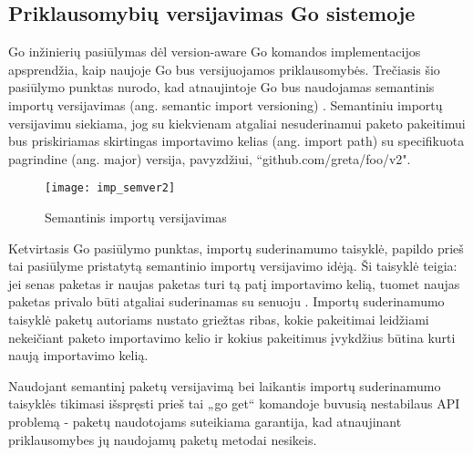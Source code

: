 \subsection{Priklausomybių versijavimas Go sistemoje}

Go inžinierių pasiūlymas dėl version-aware Go komandos implementacijos apsprendžia, kaip naujoje
Go bus versijuojamos priklausomybės. Trečiasis šio pasiūlymo punktas nurodo, kad atnaujintoje Go bus
naudojamas semantinis importų versijavimas (ang. semantic import versioning) \cite{COX18c}.
Semantiniu importų versijavimu siekiama, jog su kiekvienam atgaliai nesuderinamui paketo pakeitimui bus priskiriamas
skirtingas importavimo kelias (ang. import path) su specifikuota pagrindine (ang. major) versija, pavyzdžiui, “github.com/greta/foo/v2".

\begin{figure}[H]
    \centering
    \texttt{[image: imp\_semver2]}
    \caption{Semantinis importų versijavimas \cite{COX18d}}
\end{figure}

Ketvirtasis Go pasiūlymo punktas, importų suderinamumo taisyklė, papildo prieš
tai pasiūlyme pristatytą semantinio importų versijavimo idėją. Ši taisyklė teigia: jei
senas paketas ir naujas paketas turi tą patį importavimo kelią, tuomet naujas paketas privalo būti atgaliai
suderinamas su senuoju \cite{COX18c}. Importų suderinamumo taisyklė paketų autoriams nustato griežtas ribas, kokie pakeitimai leidžiami
nekeičiant paketo importavimo kelio ir kokius pakeitimus įvykdžius būtina kurti naują importavimo kelią.

Naudojant semantinį paketų versijavimą bei laikantis importų suderinamumo taisyklės tikimasi išspręsti prieš tai „go get“
komandoje buvusią nestabilaus API problemą - paketų naudotojams suteikiama garantija,
kad atnaujinant priklausomybes jų naudojamų paketų metodai nesikeis.
